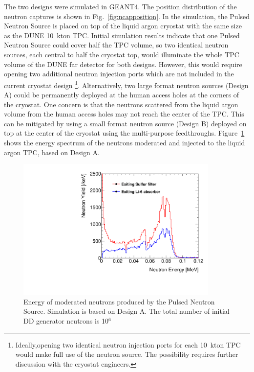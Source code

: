 The two designs were simulated in GEANT4. The position distribution of the neutron captures is shown in Fig.~\ref{fig:ncapposition}. In the simulation, the Pulsed Neutron Source is placed on top of the liquid argon cryostat with the same size as the DUNE 10~kton TPC. Initial simulation results indicate that one Pulsed Neutron Source could cover half the TPC volume, so two identical neutron sources, each central to half the cryostat top,  %
would illuminate the whole TPC volume of the DUNE far detector for both designs. However, this would require opening two additional neutron injection ports which are not included in the current cryostat design \footnote{Ideally,opening two identical neutron injection ports for each 10~kton TPC would make full use of the neutron source. The possibility requires further discussion with the cryostat engineers.}. Alternatively, two large format neutron sources (Design A) could be permanently deployed at the human access holes at the corners of the cryostat. One concern is that the neutrons scattered from the liquid argon volume from the human access holes may not reach the center of the TPC. This can be mitigated by using a small format neutron source (Design B) deployed on top at the center of the cryostat using the multi-purpose feedthroughs. %
Figure~\ref{fig:PNS_energy_design} shows the energy spectrum of the neutrons moderated and injected to the liquid argon TPC, based on Design A.

\begin{figure}[tpb]
\centering
\includegraphics[width=10cm]{graphics/PNS_Energy_Moderator.pdf}
\caption{Energy of moderated neutrons produced by the Pulsed Neutron Source. Simulation is based on Design A. The total number of initial DD generator neutrons is 10$^{6}$ }
\label{fig:PNS_energy_design}
\end{figure} 

